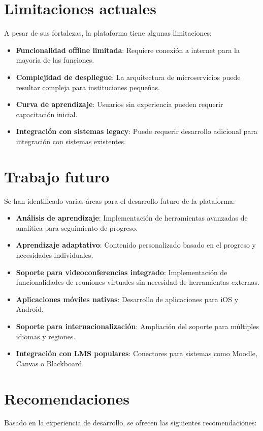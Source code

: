 \documentclass[12pt,a4paper]{report}
\begin{document}
\section{Limitaciones actuales}
A pesar de sus fortalezas, la plataforma tiene algunas limitaciones:

\begin{itemize}
    \item \textbf{Funcionalidad offline limitada}: Requiere conexión a internet para la mayoría de las funciones.
    \item \textbf{Complejidad de despliegue}: La arquitectura de microservicios puede resultar compleja para instituciones pequeñas.
    \item \textbf{Curva de aprendizaje}: Usuarios sin experiencia pueden requerir capacitación inicial.
    \item \textbf{Integración con sistemas legacy}: Puede requerir desarrollo adicional para integración con sistemas existentes.
\end{itemize}

\section{Trabajo futuro}
Se han identificado varias áreas para el desarrollo futuro de la plataforma:

\begin{itemize}
    \item \textbf{Análisis de aprendizaje}: Implementación de herramientas avanzadas de analítica para seguimiento de progreso.
    \item \textbf{Aprendizaje adaptativo}: Contenido personalizado basado en el progreso y necesidades individuales.
    \item \textbf{Soporte para videoconferencias integrado}: Implementación de funcionalidades de reuniones virtuales sin necesidad de herramientas externas.
    \item \textbf{Aplicaciones móviles nativas}: Desarrollo de aplicaciones para iOS y Android.
    \item \textbf{Soporte para internacionalización}: Ampliación del soporte para múltiples idiomas y regiones.
    \item \textbf{Integración con LMS populares}: Conectores para sistemas como Moodle, Canvas o Blackboard.
\end{itemize}

\section{Recomendaciones}
Basado en la experiencia de desarrollo, se ofrecen las siguientes recomendaciones:
\end{document}
